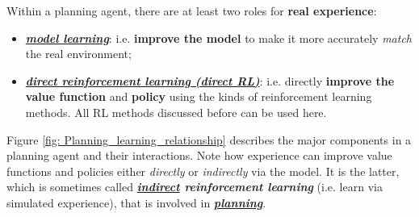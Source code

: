 \documentclass[11pt]{article}
\begin{document}
Within a planning agent, there are at least two roles for \textbf{real experience}: 
\begin{itemize}
\item \textbf{\emph{\underline{model learning}}}: i.e.   \textbf{improve the model} to make it more accurately \emph{match} the real environment;
\item \textbf{\emph{\underline{direct reinforcement learning (direct RL)}}}: i.e. directly \textbf{improve the value function} and \textbf{policy} using the kinds of reinforcement learning methods. All RL methods discussed before can be used here. 
\end{itemize} 
Figure \ref{fig: Planning_learning_relationship} describes the major components in a planning agent and their interactions.  Note how experience can improve value functions and policies either \emph{directly} or \emph{indirectly} via the model. It is the latter, which is sometimes called \textbf{\emph{\underline{indirect} reinforcement learning}} (i.e. learn via simulated experience), that is involved in \underline{\emph{\textbf{planning}}}.
\end{document}
